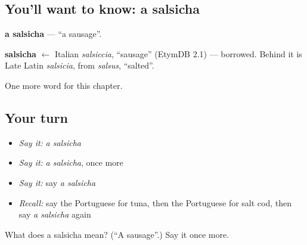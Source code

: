 \subsection*{You'll want to know: a salsicha}
\textbf{a salsicha} — \textquotedblleft{}a sausage\textquotedblright{}.

\begin{cousinweb}
\textbf{salsicha} $\leftarrow$ Italian \emph{salsiccia}, \textquotedblleft{}sausage\textquotedblright{} (EtymDB 2.1) — borrowed. Behind it is Late Latin \emph{salsicia}, from \emph{salsus}, \textquotedblleft{}salted\textquotedblright{}.
\end{cousinweb}

\begin{grammarlens}[title={What you've built}]
One more word for this chapter.
\end{grammarlens}

\subsection*{Your turn}
\begin{itemize}
\raggedright
  \item \emph{Say it:} \emph{a salsicha}
  \item \emph{Say it:} \emph{a salsicha}, once more
  \item \emph{Say it:} say \emph{a salsicha}
  \item \emph{Recall:} say the Portuguese for tuna, then the Portuguese for salt cod, then say \emph{a salsicha} again
\end{itemize}

\begin{tcolorbox}[breakable,colback=teal!4,colframe=teal!35!black,title={Before you move on}]
What does a salsicha mean? (\textquotedblleft{}A sausage\textquotedblright{}.) Say it once more.
\end{tcolorbox}
